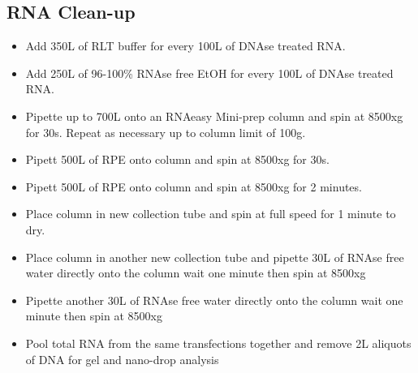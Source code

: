 \documentclass[a4paper]{article}
\begin{document}
    \subsection{RNA Clean-up}
    	\begin{itemize}
        	
        	\item Add 350\textmu L of RLT buffer for every 100\textmu L of DNAse treated RNA.
            
            \item Add 250\textmu L of 96-100\% RNAse free EtOH for every 100\textmu L of DNAse treated RNA.
            
            \item Pipette up to 700\textmu L onto an RNAeasy Mini-prep column and spin at 8500xg for 30s. Repeat as necessary up to column limit of 100\textmu g.
            
            \item Pipett 500\textmu L of RPE onto column and spin at 8500xg for 30s.
            
            \item Pipett 500\textmu L of RPE onto column and spin at 8500xg for 2 minutes.
        	
            \item Place column in new collection tube and spin at full speed for 1 minute to dry.
            
            \item Place column in another new collection tube and pipette 30\textmu L of RNAse free water directly onto the column wait one minute then spin at 8500xg 
        
        	 \item Pipette another 30\textmu L of RNAse free water directly onto the column wait one minute then spin at 8500xg
        
			\item Pool total RNA from the same transfections together and remove 2\textmu L aliquots of DNA for gel and nano-drop analysis        
        \end{itemize}
\end{document}

